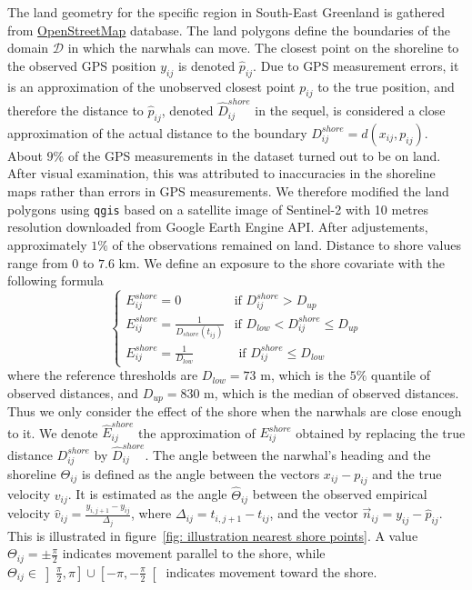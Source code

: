 \documentclass[11pt]{article}
\newcommand {\1}{\mathbb{1}}
\begin{document}
The land geometry for the specific region in South-East Greenland is gathered from \href{https://www.openstreetmap.org/#map=11/70.4029/-27.2928}{OpenStreetMap} database. The land polygons define the boundaries of the domain $\mathcal{D}$ in which the narwhals can move. The closest point on the shoreline to the observed GPS position $y_{ij}$  is denoted $\hat{p}_{ij}$. Due to GPS measurement errors, it is an approximation of the unobserved closest point $p_{ij}$ to the true position, and therefore the distance to $\hat{p}_{ij}$, denoted $\hat{D}^{shore}_{ij}$ in the sequel, is considered a close approximation of the actual distance to the boundary $D^{shore}_{ij}=d(x_{ij},p_{ij})$. About $9\%$ of the GPS measurements in the dataset turned out to be on land. After visual examination, this was attributed to inaccuracies in the shoreline maps rather than errors in GPS measurements. We therefore modified the land polygons using \texttt{qgis} based on a satellite image of Sentinel-2 with 10 metres resolution downloaded from Google Earth Engine API. After adjustements,  approximately $1 \%$ of the observations remained on land. Distance to shore values range from $0$ to $7.6$ km. We define an exposure to the shore covariate with the following formula
\begin{equation}
	\left\{
	\begin{array}{ll}
		E^{shore}_{ij}=0 & \mbox{if } D^{shore}_{ij}>D_{up} \\
		E^{shore}_{ij}=\frac{1}{D_{shore}(t_{ij})} & \mbox{if } D_{low}<D^{shore}_{ij} \leq D_{up} \\
		E^{shore}_{ij}=\frac{1}{D_{low}} & \mbox{ if } D^{shore}_{ij} \leq D_{low}
	\end{array}
	\right.
	\label{eq: exp shore definition}
\end{equation}
where the reference thresholds are $D_{low}=73$ m, which is the $5\%$ quantile of observed distances, and $D_{up}=830$ m, which is the median of observed distances. Thus we only consider the effect of the shore when the narwhals are close enough to it. We denote $\hat{E}^{shore}_{ij}$ the approximation of $E^{shore}_{ij}$ obtained by replacing the true distance $D^{shore}_{ij}$ by $\hat{D}^{shore}_{ij}$.
The angle between the narwhal's heading and the shoreline $\Theta_{ij}$ is defined as the angle between the vectors $x_{ij}-p_{ij}$ and the true velocity $v_{ij}$. It is estimated as the angle $\hat{\Theta}_{ij}$ between the observed empirical velocity $\hat{v}_{ij}=\frac{y_{i,j+1}-y_{ij}}{\Delta_j}$, where $\Delta_{ij}=t_{i,j+1}-t_{ij}$, and the vector $\vec{n}_{ij}=y_{ij}-\hat{p}_{ij}$. This is illustrated in figure~\ref{fig: illustration nearest shore points}. A value $\Theta_{ij}=\pm \frac{\pi}{2}$ indicates movement parallel to the shore, while $\Theta_{ij} \in \left]\frac{\pi}{2},\pi\right] \cup \left[-\pi,-\frac{\pi}{2}\right[$ indicates movement toward the shore. 
\end{document}
